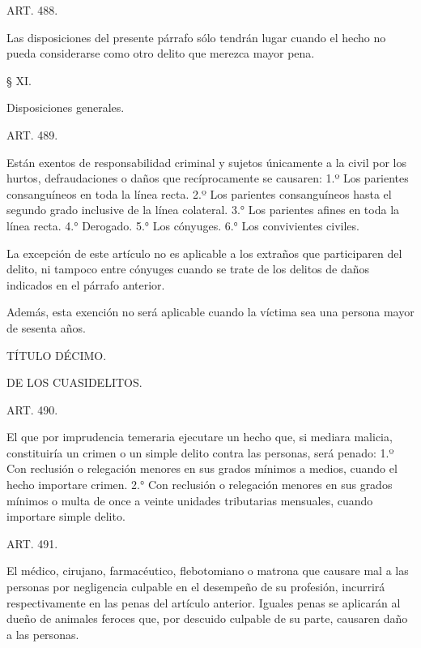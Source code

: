     ART. 488.

    Las disposiciones del presente párrafo sólo tendrán lugar cuando el hecho no pueda considerarse como otro delito que merezca mayor pena.



    § XI.

    Disposiciones generales.





    ART. 489.

    Están exentos de responsabilidad criminal y sujetos únicamente a la civil por los hurtos, defraudaciones o daños que recíprocamente se causaren:
    1.º Los parientes consanguíneos en toda la línea recta.
    2.º Los parientes consanguíneos hasta el segundo grado inclusive de la línea colateral.
    3.° Los parientes afines en toda la línea recta.
    4.° Derogado.
    5.° Los cónyuges.
    6.° Los convivientes civiles.

    La excepción de este artículo no es aplicable a los extraños que participaren del delito, ni tampoco entre cónyuges cuando se trate de los delitos de daños indicados en el párrafo anterior.

    Además, esta exención no será aplicable cuando la víctima sea una persona mayor de sesenta años.






    TÍTULO DÉCIMO.

    DE LOS CUASIDELITOS.




    ART. 490.

    El que por imprudencia temeraria ejecutare un hecho que, si mediara malicia, constituiría un crimen o un simple delito contra las personas, será penado:
    1.º Con reclusión o relegación menores en sus grados mínimos a medios, cuando el hecho importare crimen.
    2.° Con reclusión o relegación menores en sus grados mínimos o multa de once a veinte unidades tributarias mensuales, cuando importare simple delito.




    ART. 491.

    El médico, cirujano, farmacéutico, flebotomiano o matrona que causare mal a las personas por negligencia culpable en el desempeño de su profesión, incurrirá respectivamente en las penas del artículo anterior.
    Iguales penas se aplicarán al dueño de animales feroces que, por descuido culpable de su parte, causaren daño a las personas.



